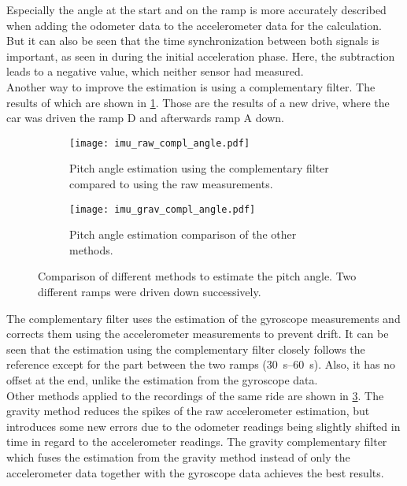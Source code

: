 Especially the angle at the start and on the ramp is more accurately described when adding the odometer data to the accelerometer data for the calculation.
But it can also be seen that the time synchronization between both signals is important, as seen in during the initial acceleration phase.
Here, the subtraction leads to a negative value, which neither sensor had measured.\\
Another way to improve the estimation is using a complementary filter.
The results of which are shown in \cref{fig:imu_raw_compl_angle}.
Those are the results of a new drive, where the car was driven the ramp D and afterwards ramp A down.
\begin{figure}[htb]
	\centering
	\begin{subfigure}{1\textwidth}
		\centering
		\texttt{[image: imu\_raw\_compl\_angle.pdf]}
		\caption{Pitch angle estimation using the complementary filter compared to using the raw measurements.}
		\label{fig:imu_raw_compl_angle}
	\end{subfigure}
	
	\begin{subfigure}{1\textwidth}
		\centering
		\texttt{[image: imu\_grav\_compl\_angle.pdf]}
		\caption{Pitch angle estimation comparison of the other methods.}
		\label{fig:imu_grav_compl_angle}
	\end{subfigure}
	\caption{Comparison of different methods to estimate the pitch angle. Two different ramps were driven down successively.}
\end{figure}
The complementary filter uses the estimation of the gyroscope measurements and corrects them using the accelerometer measurements to prevent drift.
It can be seen that the estimation using the complementary filter closely follows the reference except for the part between the two ramps (\SIrange{30}{60}{\second}).
Also, it has no offset at the end, unlike the estimation from the gyroscope data.\\
Other methods applied to the recordings of the same ride are shown in \cref{fig:imu_grav_compl_angle}.
The gravity method reduces the spikes of the raw accelerometer estimation, but introduces some new errors due to the odometer readings being slightly shifted in time in regard to the accelerometer readings.
The gravity complementary filter which fuses the estimation from the gravity method instead of only the accelerometer data together with the gyroscope data achieves the best results.

